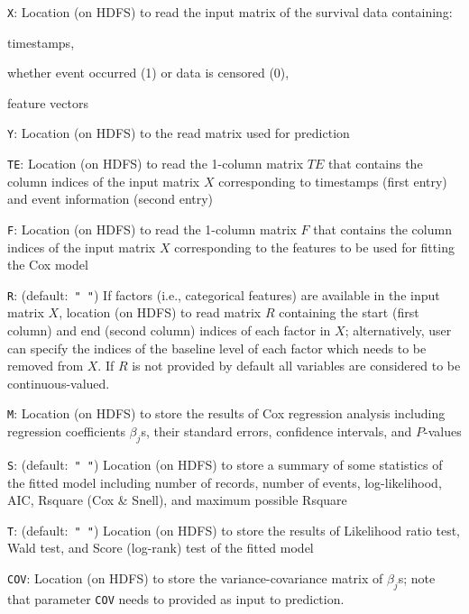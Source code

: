\smallskip
{}
\begin{Description}
\item[{\tt X}:]
Location (on HDFS) to read the input matrix of the survival data containing: 
\begin{Itemize}
	\item timestamps,
	\item whether event occurred (1) or data is censored (0),
	\item feature vectors
\end{Itemize}
\item[{\tt Y}:]
Location (on HDFS) to the read matrix used for prediction 
\item[{\tt TE}:]
Location (on HDFS) to read the 1-column matrix $TE$ that contains the column indices of the input matrix $X$ corresponding to timestamps (first entry) and event information (second entry)
\item[{\tt F}:]
Location (on HDFS) to read the 1-column matrix $F$ that contains the column indices of the input matrix $X$ corresponding to the features to be used for fitting the Cox model
\item[{\tt R}:] (default:\mbox{ }{\tt " "})
If factors (i.e., categorical features) are available in the input matrix $X$, location (on HDFS) to read matrix $R$ containing the start (first column) and end (second column) indices of each factor in $X$;
alternatively, user can specify the indices of the baseline level of each factor which needs to be removed from $X$. If $R$ is not provided by default all variables are considered to be continuous-valued.
\item[{\tt M}:]							
Location (on HDFS) to store the results of Cox regression analysis including regression coefficients $\beta_j$s, their standard errors, confidence intervals, and $P$-values  
\item[{\tt S}:] (default:\mbox{ }{\tt " "})
Location (on HDFS) to store a summary of some statistics of the fitted model including number of records, number of events, log-likelihood, AIC, Rsquare (Cox \& Snell), and maximum possible Rsquare 
\item[{\tt T}:] (default:\mbox{ }{\tt " "})
Location (on HDFS) to store the results of Likelihood ratio test, Wald test, and Score (log-rank) test of the fitted model
\item[{\tt COV}:]
Location (on HDFS) to store the variance-covariance matrix of $\beta_j$s; note that parameter {\tt COV} needs to provided as input to prediction.

\end{Description}
